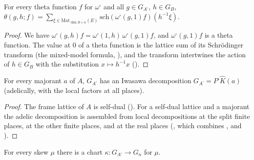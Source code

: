 \begin{lemma}\label{pf:stageU:thetaS}
For every theta function $f$ for $\omega^\square$ and all $g\in G_{A^\square}$, $h\in G_B$,
$\theta(g,h;f)=\sum_{\xi\in\mathrm{Mat}_{\dim B\times n}(E)}\mathrm{sch}(\omega^\square(g,1)f)(h^{-1}\xi)$.
\end{lemma}

\begin{proof}
We have $\omega^\square(g,h)f=\omega^\square(1,h)\,\omega^\square(g,1)f$, and $\omega^\square(g,1)f$ is a theta function. The value at $0$
of a theta function is the lattice sum of its Schr\"odinger transform (the mixed-model formula,
), and the transform intertwines the action of $h\in G_B$ with the substitution
$x\mapsto h^{-1}x$ ().
\end{proof}

\begin{lemma}\label{pf:stageU:iwasawa}
For every majorant $a$ of $A$, $G_{A^\square}$ has an Iwasawa decomposition $G_{A^\square}=P^\square\hat K(a)$ (adelically, with the
local factors at all places).
\end{lemma}

\begin{proof}
The frame lattice of $A$ is self-dual (). For a self-dual lattice and a
majorant the adelic decomposition is assembled from local decompositions at the split finite places, at the other finite
places, and at the real places (, which combines
,
 and
).
\end{proof}

\begin{lemma}\label{pf:stageU:chart}
For every skew $\mu$ there is a chart $\kappa:G_{A^\square}\to G_n$ for $\mu$.
\end{lemma}

